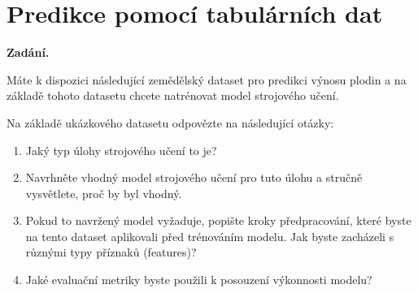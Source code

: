 \section{Predikce pomocí tabulárních dat}

\noindent\textbf{Zadání.}\par
Máte k dispozici následující zemědělský dataset pro predikci výnosu plodin a na základě tohoto
datasetu chcete natrénovat model strojového učení.

\begin{center}\small
{}
\end{center}

Na základě ukázkového datasetu odpovězte na následující otázky:
\begin{enumerate}
  \item Jaký typ úlohy strojového učení to je?
  \item Navrhněte vhodný model strojového učení pro tuto úlohu a stručně vysvětlete, proč by byl vhodný.
  \item Pokud to navržený model vyžaduje, popište kroky předpracování, které byste na tento dataset
    aplikovali před trénováním modelu. Jak byste zacházeli s různými typy příznaků (features)?
  \item Jaké evaluační metriky byste použili k posouzení výkonnosti modelu?
\end{enumerate}

